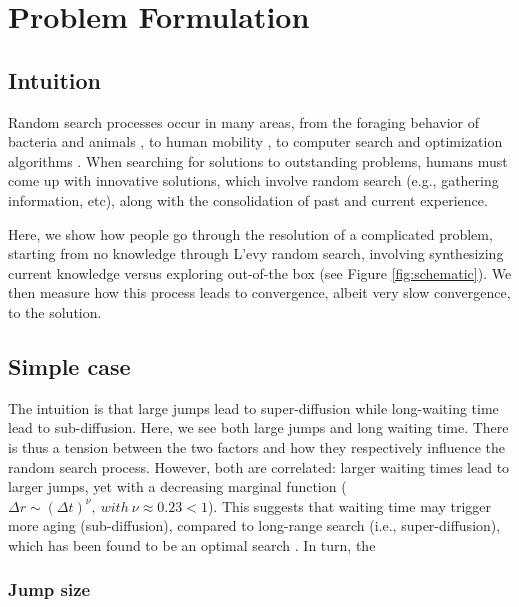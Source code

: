 \section{Problem Formulation}
\subsection{Intuition}

Random search processes occur in many areas, from the foraging behavior
of bacteria and animals \cite{}, to human mobility \cite{}, to computer search and optimization algorithms \cite{}.  When searching for solutions to outstanding problems, humans must come up with innovative solutions, which involve random search (e.g., gathering information, etc), along with the consolidation of past and current experience.

Here, we show how people go through the resolution of a complicated problem, starting from no knowledge through L'evy random search, involving synthesizing current knowledge versus exploring out-of-the box (see Figure \ref{fig:schematic}). We then measure how this process leads to convergence, albeit very slow convergence, to the solution.



\subsection{Simple case}

The intuition is that large jumps lead to super-diffusion while long-waiting time lead to sub-diffusion. Here, we see both large jumps and long waiting time. There is thus a tension between the two factors and how they respectively influence the random search process. However, both are correlated: larger waiting times lead to larger jumps, yet with a decreasing marginal function ($\Delta r \sim {(\Delta t)}^{\nu},~with ~\nu \approx 0.23 < 1$). This suggests that waiting time may trigger more aging (sub-diffusion), compared to long-range search (i.e., super-diffusion), which has been found to be an optimal search \cite{optimal_random_search}. In turn, the




\subsubsection{Jump size}

